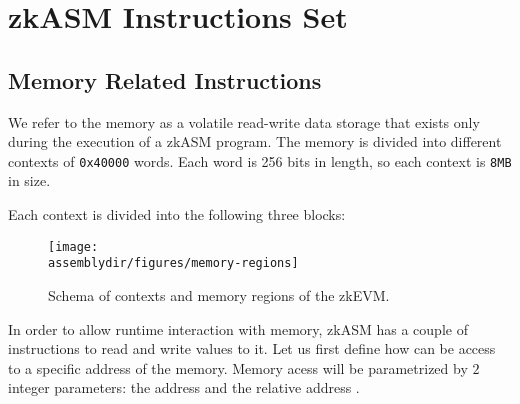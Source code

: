 
\section{zkASM Instructions Set} \label{sec:instructions}

\subsection{Memory Related Instructions}


We refer to the memory as a volatile read-write data storage that exists only during the execution of a zkASM program. The memory is divided into different contexts of \texttt{0x40000} words. Each word is 256 bits in length, so each context is \texttt{8MB} in size.

Each context is divided into the following three blocks:



\begin{figure}[H]
    \centering
    \texttt{[image: \\assemblydir/figures/memory-regions]}
    \caption{Schema of contexts and memory regions of the zkEVM.}
    \label{fig:memory-regions}
\end{figure}


In order to allow runtime interaction with memory, zkASM has a couple of instructions to read and write values to it. Let us first define how can be access to a specific address of the memory. Memory acess will be parametrized by $2$ integer parameters: the address \addr and the relative address \relAddr. 

